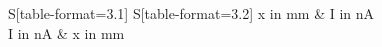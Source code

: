 \begin{table}
    \centering
    \caption{Intensität der TEM$_{00}$-Mode entlang der x-Achse}
    \label{tab:TEM_00}
    \begin{tabular}{
	S[table-format=3.1]
	S[table-format=3.2]
	}
	\toprule
	{x in \si{\milli\meter}}		& {I in \si{\nano\ampere}}		\\ 
	{I in \si{\nano\ampere}}		& {x in \si{\milli\meter}}		\\ 
	\midrule
    
    \bottomrule
    \end{tabular}
    \end{table}
